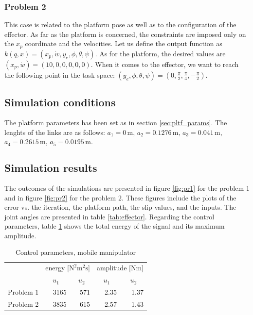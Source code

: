 \subsubsection{Problem 2}
This case is related to the platform pose as well as to the configuration of the effector.
As far as the platform is concerned, the constraints are imposed only on the $x_p$ coordinate and
the velocities. Let us define the output function as $k(q, x) = (x_p, \dot w, y_e, \phi, \theta, \psi)$.
As for the platform, the desired values are
$(x_p, \dot{w}) = (10, 0, 0, 0, 0, 0)$. When it comes to
the effector, we want to reach the following point in the task space: $(y_e, \phi, \theta, \psi)
= (0, \frac{\pi}{2}, \frac{\pi}{4}, -\frac{\pi}{2})$.

\subsection{Simulation conditions}
The platform parameters has been set as in section \ref{sec:pltf_params}. The lenghts of the links
are as follows: $a_1=0 \,\mathrm{m}$,
$a_2=0.1276 \,\mathrm{m}$,
$a_3=0.041 \,\mathrm{m}$,
$a_4=0.2615 \,\mathrm{m}$,
$a_5=0.0195 \,\mathrm{m}$.

\subsection{Simulation results}
The outcomes of the simulations are presented in figure \ref{fig:pr1} for the problem 1 and in figure
\ref{fig:pr2} for the problem 2. These figures include the plots of the error vs. the
iteration, the platform path, the slip values, and the inputs. The joint angles are
presented in table \ref{tab:effector}. Regarding the control parameters, table \ref{tab:in_eff}
shows the total energy of the signal and its maximum amplitude.

\begin{table}[!htb]
\caption{Control parameters, mobile manipulator}
\label{tab:in_eff}
\centering
\begin{tabular}{l|r|r|r|r|}
\cline{2-5}
\multicolumn{1}{c|}{}             & \multicolumn{2}{c|}{energy [$\mathrm{N^2m^2s}$]}                             & \multicolumn{2}{c|}{amplitude [$\mathrm{Nm}$]}                          \\ \cline{2-5} 
\multicolumn{1}{c|}{}             & \multicolumn{1}{c|}{$u_1$} & \multicolumn{1}{c|}{$u_2$} & \multicolumn{1}{c|}{$u_1$} & \multicolumn{1}{c|}{$u_2$} \\ \hline
\multicolumn{1}{|l|}{Problem 1} & 3165                       & 571                        & 2.35                       & 1.37                       \\ \hline
\multicolumn{1}{|l|}{Problem 2} & 3835                       & 615                        & 2.57                       & 1.43                       \\ \hline
\end{tabular}
\end{table}

